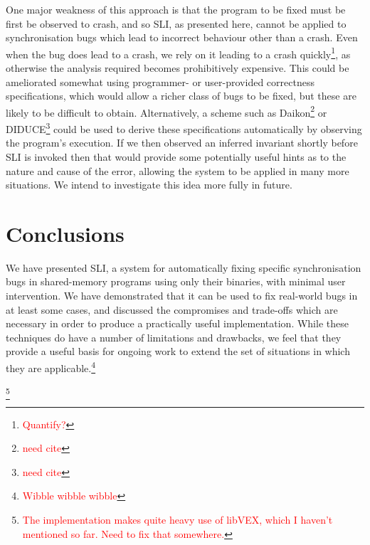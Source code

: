 \documentclass[10pt,twocolumn,preprint,natbib,authoryear]{sigplanconf}
\newcommand{\editorial}[1]{\textcolor{red}{\footnote{\textcolor{red}{#1}}}}
\newcommand{\needCite}{\editorial{need cite}}
\begin{document}
One major weakness of this approach is that the program to be fixed
must be first be observed to crash, and so SLI, as presented here,
cannot be applied to synchronisation bugs which lead to incorrect
behaviour other than a crash.  Even when the bug does lead to a crash,
we rely on it leading to a crash quickly\editorial{Quantify?}, as
otherwise the analysis required becomes prohibitively expensive.  This
could be ameliorated somewhat using programmer- or user-provided
correctness specifications, which would allow a richer class of bugs
to be fixed, but these are likely to be difficult to obtain.
Alternatively, a scheme such as Daikon\needCite{} or DIDUCE\needCite{}
could be used to derive these specifications automatically by
observing the program's execution.  If we then observed an inferred
invariant shortly before SLI is invoked then that would provide some
potentially useful hints as to the nature and cause of the error,
allowing the system to be applied in many more situations.  We intend
to investigate this idea more fully in future.

\section{Conclusions}

We have presented SLI, a system for automatically fixing specific
synchronisation bugs in shared-memory programs using only their
binaries, with minimal user intervention.  We have demonstrated that
it can be used to fix real-world bugs in at least some cases, and
discussed the compromises and trade-offs which are necessary in order
to produce a practically useful implementation.  While these
techniques do have a number of limitations and drawbacks, we feel that
they provide a useful basis for ongoing work to extend the set of
situations in which they are applicable.\editorial{Wibble wibble
  wibble}

\acks

\editorial{The implementation makes quite heavy use of libVEX, which I
  haven't mentioned so far.  Need to fix that somewhere.}




\end{document}
